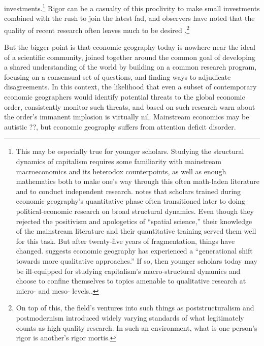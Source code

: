 investments.\footnote{This may be especially true for younger scholars. Studying the structural
dynamics of capitalism requires some familiarity with mainstream macroeconomics
and its heterodox counterpoints, as well as enough mathematics both
to make one's way through this often math-laden literature and to
conduct independent research. \citet[490]{scott07economic} notes
that scholars trained during economic geography's quantitative phase
often transitioned later to doing political-economic research on broad
structural dynamics. Even though they rejected the positivism and
apologetics of ``spatial science,'' their knowledge of the mainstream
literature and their quantitative training served them well for this
task. But after twenty-five years of fragmentation, things have changed.
\citet[119]{peck2012economic} suggests economic geography has experienced
a ``generational shift towards more qualitative approaches.'' If
so, then younger scholars today may be ill-equipped for studying capitalism's
macro-structural dynamics and choose to confine themselves to topics
amenable to qualitative research at micro- and meso- levels..} Rigor can be a casualty of this proclivity to make small investments
combined with the rush to join the latest fad, and observers have
noted that the quality of recent research often leaves much to be
desired \citep{markusen1fuzzyconcepts,martin2001rethinking}.\footnote{On top of this, the field's ventures into such things as poststructuralism
and postmodernism introduced widely varying standards of what legitimately
counts as high-quality research. In such an environment, what is one
person's rigor is another's rigor mortis. }

But the bigger point is that economic geography today is nowhere near
the ideal of a scientific community, joined together around the common
goal of developing a shared understanding of the world by building
on a common research program, focusing on a consensual set of questions,
and finding ways to adjudicate disagreements. In this context, the
likelihood that even a subset of contemporary economic geographers
would identify potential threats to the global economic order, consistently
monitor such threats, and based on such research warn about the order's
immanent implosion is virtually nil. Mainstream economics may be autistic
??, but economic geography suffers from attention deficit disorder.

